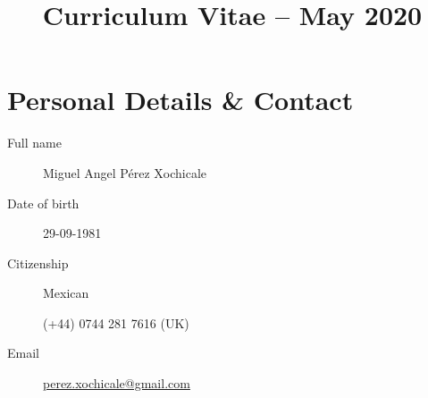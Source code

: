 \documentclass[10pt,a4paper,roman]{moderncv}
\title{Curriculum Vitae -- May 2020}
\begin{document}
%
%
\makecvtitle



%


\vspace{-10mm}


\section{Personal Details \& Contact}
%

\begin{changemargin}{2.4cm}{0.5cm}
  \begin{minipage}{.4\textwidth}
    \begin{description}
	\item[Full name] Miguel Angel P\'erez Xochicale
     	\item[Date of birth] 29-09-1981
	\item[Citizenship] Mexican 

     \end{description}
  \end{minipage}
  \begin{minipage}{.4\textwidth}
  \begin{description}
     	\item[\faMobile ]  (+44) 0744 281 7616 (UK)
	\item[Email]  
		\href{perez.xochicale@gmail.com}
			{perez.xochicale@gmail.com}
	
   \end{description}
  \end{minipage}
\end{changemargin}
\end{document}
